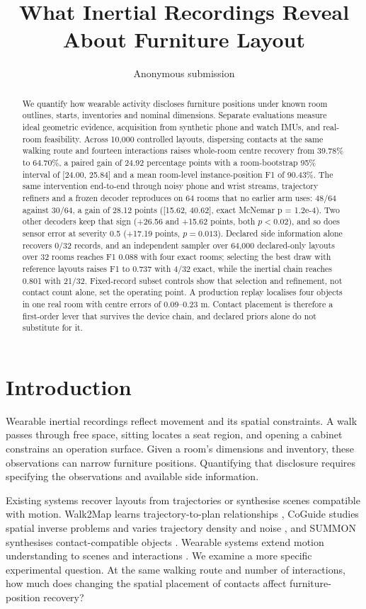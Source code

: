 \documentclass[10pt,twocolumn,letterpaper]{article}
\title{What Inertial Recordings Reveal About Furniture Layout}
\author{Anonymous submission}
\begin{document}
\maketitle
\begin{abstract}
We quantify how wearable activity discloses furniture positions under
known room outlines, starts, inventories and nominal dimensions.
Separate evaluations measure ideal geometric evidence, acquisition from
synthetic phone and watch IMUs, and real-room feasibility. Across 10,000
controlled layouts, dispersing contacts at the same walking route and
fourteen interactions raises whole-room centre recovery from 39.78\% to
64.70\%, a paired gain of 24.92 percentage points with a room-bootstrap
95\% interval of {[}24.00, 25.84{]} and a mean room-level
instance-position F1 of 90.43\%. The same intervention end-to-end through
noisy phone and wrist streams, trajectory refiners and a frozen decoder
reproduces on 64 rooms that no earlier arm uses: 48/64 against 30/64, a
gain of 28.12 points ({[}15.62, 40.62{]}, exact McNemar p = 1.2e-4).
Two other decoders keep that sign (+26.56 and +15.62 points, both
$p<0.02$), and so does sensor error at severity 0.5 (+17.19 points,
$p=0.013$).
Declared side information alone recovers 0/32 records, and an
independent sampler over 64,000 declared-only layouts over 32 rooms
reaches F1 0.088 with four exact rooms; selecting the best draw with
reference layouts raises F1 to 0.737 with 4/32 exact, while the inertial
chain reaches 0.801 with 21/32. Fixed-record subset controls show that
selection and refinement, not contact count alone, set the operating
point. A production replay localises four objects in one real room with
centre errors of 0.09--0.23 m. Contact placement is therefore a
first-order lever that survives the device chain, and declared priors
alone do not substitute for it.
\end{abstract}
\section{Introduction}\label{introduction}

Wearable inertial recordings reflect movement and its spatial
constraints. A walk passes through free space, sitting locates a seat
region, and opening a cabinet constrains an operation surface. Given a
room's dimensions and inventory, these observations can narrow furniture
positions. Quantifying that disclosure requires specifying the
observations and available side information.

Existing systems recover layouts from trajectories or synthesise scenes
compatible with motion. Walk2Map learns trajectory-to-plan relationships
\cite{r1}, CoGuide studies spatial inverse problems and varies
trajectory density and noise \cite{r2}, and SUMMON synthesises
contact-compatible objects \cite{r3}. Wearable systems extend motion
understanding to scenes and interactions \cite{r4,r12}. We examine a
more specific experimental question. At the same walking route and
number of interactions, how much does changing the spatial placement of
contacts affect furniture-position recovery?
\end{document}
